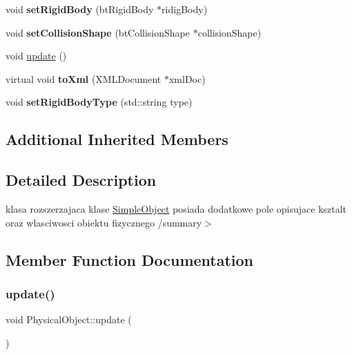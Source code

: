 \begin{DoxyCompactItemize}
\mbox{\label{class_physical_object_a4aefb72365f6a824a04d0090bfe8c078}} 
void {\bfseries set\+Rigid\+Body} (bt\+Rigid\+Body $\ast$ridig\+Body)
\item 
\mbox{\label{class_physical_object_a593d2b001986681081bd39a134788ef8}} 
void {\bfseries set\+Collision\+Shape} (bt\+Collision\+Shape $\ast$collision\+Shape)
\item 
void \hyperlink{class_physical_object_a3005ac0afce838049101db17525f6004}{update} ()
\item 
\mbox{\label{class_physical_object_a48b1709afb0f331deb7b59e5d98ccdc5}} 
virtual void {\bfseries to\+Xml} (X\+M\+L\+Document $\ast$xml\+Doc)
\item 
\mbox{\label{class_physical_object_a6148d7d581c15eafa4d8a885719083dc}} 
void {\bfseries set\+Rigid\+Body\+Type} (std\+::string type)
\end{DoxyCompactItemize}
\subsection*{Additional Inherited Members}


\subsection{Detailed Description}
klasa rozszerzajaca klase \hyperlink{class_simple_object}{Simple\+Object} posiada dodatkowe pole opisujace ksztalt oraz wlasciwosci obiektu fizycznego /summary$>$ 

\subsection{Member Function Documentation}
\mbox{\label{class_physical_object_a3005ac0afce838049101db17525f6004}} 
\subsubsection{\texorpdfstring{update()}{update()}}
{\footnotesize\ttfamily void Physical\+Object\+::update (\begin{DoxyParamCaption}{ }\end{DoxyParamCaption})\hspace{0.3cm}{\ttfamily [virtual]}}

